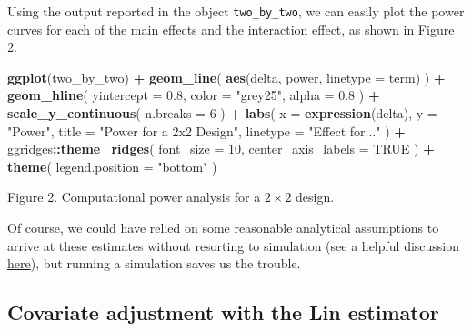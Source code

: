 \documentclass[
  12pt,
]{book}
\newenvironment{Shaded}{\begin{snugshade}}{\end{snugshade}}
\newcommand{\DataTypeTok}[1]{\textcolor[rgb]{0.13,0.29,0.53}{#1}}
\newcommand{\DecValTok}[1]{\textcolor[rgb]{0.00,0.00,0.81}{#1}}
\newcommand{\FloatTok}[1]{\textcolor[rgb]{0.00,0.00,0.81}{#1}}
\newcommand{\KeywordTok}[1]{\textcolor[rgb]{0.13,0.29,0.53}{\textbf{#1}}}
\newcommand{\NormalTok}[1]{#1}
\newcommand{\OperatorTok}[1]{\textcolor[rgb]{0.81,0.36,0.00}{\textbf{#1}}}
\newcommand{\OtherTok}[1]{\textcolor[rgb]{0.56,0.35,0.01}{#1}}
\newcommand{\StringTok}[1]{\textcolor[rgb]{0.31,0.60,0.02}{#1}}
\theoremstyle{definition}
\theoremstyle{definition}
\theoremstyle{definition}
\theoremstyle{remark}
\begin{document}
Using the output reported in the object \texttt{two\_by\_two}, we can
easily plot the power curves for each of the main effects and the
interaction effect, as shown in Figure 2.

\begin{Shaded}
\begin{Highlighting}[]
\KeywordTok{ggplot}\NormalTok{(two_by_two) }\OperatorTok{+}
\StringTok{  }\KeywordTok{geom_line}\NormalTok{(}
    \KeywordTok{aes}\NormalTok{(delta, power, }\DataTypeTok{linetype =}\NormalTok{ term)}
\NormalTok{  ) }\OperatorTok{+}
\StringTok{  }\KeywordTok{geom_hline}\NormalTok{(}
    \DataTypeTok{yintercept =} \FloatTok{0.8}\NormalTok{,}
    \DataTypeTok{color =} \StringTok{"grey25"}\NormalTok{,}
    \DataTypeTok{alpha =} \FloatTok{0.8}
\NormalTok{  ) }\OperatorTok{+}
\StringTok{  }\KeywordTok{scale_y_continuous}\NormalTok{(}
    \DataTypeTok{n.breaks =} \DecValTok{6}
\NormalTok{  ) }\OperatorTok{+}
\StringTok{  }\KeywordTok{labs}\NormalTok{(}
    \DataTypeTok{x =} \KeywordTok{expression}\NormalTok{(delta),}
    \DataTypeTok{y =} \StringTok{"Power"}\NormalTok{,}
    \DataTypeTok{title =} \StringTok{"Power for a 2x2 Design"}\NormalTok{,}
    \DataTypeTok{linetype =} \StringTok{"Effect for..."}
\NormalTok{  ) }\OperatorTok{+}
\StringTok{  }\NormalTok{ggridges}\OperatorTok{::}\KeywordTok{theme_ridges}\NormalTok{(}
    \DataTypeTok{font_size =} \DecValTok{10}\NormalTok{,}
    \DataTypeTok{center_axis_labels =} \OtherTok{TRUE}
\NormalTok{  ) }\OperatorTok{+}
\StringTok{  }\KeywordTok{theme}\NormalTok{(}
    \DataTypeTok{legend.position =} \StringTok{"bottom"}
\NormalTok{  )}
\end{Highlighting}
\end{Shaded}

Figure 2. Computational power analysis for a \(2\times 2\) design.

Of course, we could have relied on some reasonable analytical
assumptions to arrive at these estimates without resorting to simulation
(see a helpful discussion
\href{https://statmodeling.stat.columbia.edu/2018/03/15/need-16-times-sample-size-estimate-interaction-estimate-main-effect/}{here}),
but running a simulation saves us the trouble.

\hypertarget{covariate-adjustment-with-the-lin-estimator}{%
\subsection{Covariate adjustment with the Lin
estimator}\label{covariate-adjustment-with-the-lin-estimator}}
\end{document}

